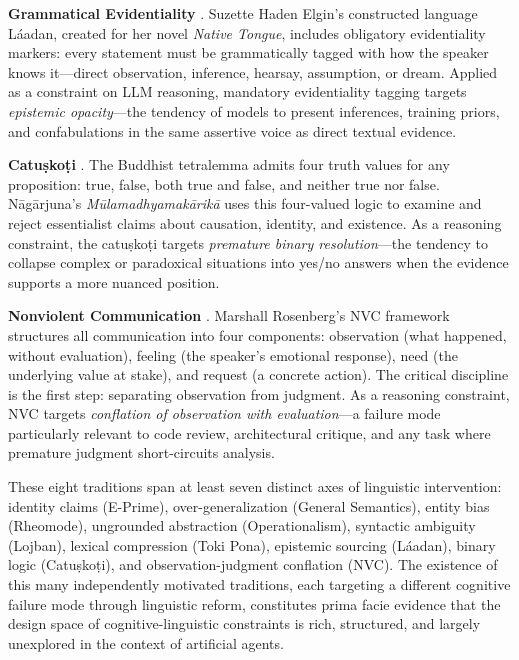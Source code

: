 \documentclass[11pt,a4paper]{article}
\begin{document}
\textbf{Grammatical Evidentiality} \citep{elgin1984}. Suzette Haden Elgin's constructed language L\'{a}adan, created for her novel \emph{Native Tongue}, includes obligatory evidentiality markers: every statement must be grammatically tagged with how the speaker knows it---direct observation, inference, hearsay, assumption, or dream. Applied as a constraint on LLM reasoning, mandatory evidentiality tagging targets \emph{epistemic opacity}---the tendency of models to present inferences, training priors, and confabulations in the same assertive voice as direct textual evidence.

\textbf{Catu\d{s}ko\d{t}i} \citep{nagarjuna150}. The Buddhist tetralemma admits four truth values for any proposition: true, false, both true and false, and neither true nor false. N\={a}g\={a}rjuna's \emph{M\={u}lamadhyamak\={a}rik\={a}} uses this four-valued logic to examine and reject essentialist claims about causation, identity, and existence. As a reasoning constraint, the catu\d{s}ko\d{t}i targets \emph{premature binary resolution}---the tendency to collapse complex or paradoxical situations into yes/no answers when the evidence supports a more nuanced position.

\textbf{Nonviolent Communication} \citep{rosenberg2003}. Marshall Rosenberg's NVC framework structures all communication into four components: observation (what happened, without evaluation), feeling (the speaker's emotional response), need (the underlying value at stake), and request (a concrete action). The critical discipline is the first step: separating observation from judgment. As a reasoning constraint, NVC targets \emph{conflation of observation with evaluation}---a failure mode particularly relevant to code review, architectural critique, and any task where premature judgment short-circuits analysis.

These eight traditions span at least seven distinct axes of linguistic intervention: identity claims (E-Prime), over-generalization (General Semantics), entity bias (Rheomode), ungrounded abstraction (Operationalism), syntactic ambiguity (Lojban), lexical compression (Toki Pona), epistemic sourcing (L\'{a}adan), binary logic (Catu\d{s}ko\d{t}i), and observation-judgment conflation (NVC). The existence of this many independently motivated traditions, each targeting a different cognitive failure mode through linguistic reform, constitutes prima facie evidence that the design space of cognitive-linguistic constraints is rich, structured, and largely unexplored in the context of artificial agents.
\end{document}
